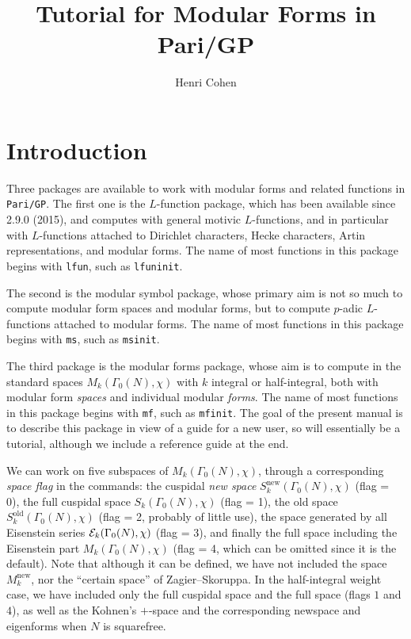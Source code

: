 \documentclass[11pt]{article}
\newcommand{\G}{\Gamma}
\newcommand{\new}{\text{new}}
\def\kbd#1{{\tt #1}}
\begin{document}
\pagestyle{plain}

\title{Tutorial for Modular Forms in Pari/GP}
\author{Henri Cohen}

\maketitle

\smallskip

\section{Introduction}

Three packages are available to work with modular forms and related functions
in \kbd{Pari/GP}. The first one is the $L$-function package, which has been
available since 2.9.0 (2015), and computes with general motivic
$L$-functions, and in particular with $L$-functions attached to Dirichlet
characters, Hecke characters, Artin representations, and modular forms. The
name of most functions in this package begins with \kbd{lfun}, such as
\kbd{lfuninit}.

The second is the modular symbol package, whose primary aim
is not so much to compute modular form spaces and modular forms, but to
compute $p$-adic $L$-functions attached to modular forms. The name of most
functions in this package begins with \kbd{ms}, such as \kbd{msinit}.

The third package is the modular forms package, whose aim is to compute in
the standard spaces $M_k(\G_0(N),\chi)$ with $k$ integral or half-integral,
both with modular form \emph{spaces} and individual modular \emph{forms}. The
name of most functions in this package begins with \kbd{mf}, such as
\kbd{mfinit}. The goal of the present manual is to describe this package in
view of a guide for a new user, so will essentially be a tutorial,
although we include a reference guide at the end.

\medskip

We can work on five subspaces of $M_k(\G_0(N),\chi)$, through a
corresponding \emph{space flag} in the commands: the cuspidal \emph{new
space} $S_k^{\new}(\G_0(N),\chi)$ (flag = 0), the full cuspidal space
$S_k(\G_0(N),\chi)$ (flag = 1), the old space $S_k^{\text{old}}(\G_0(N),\chi)$
(flag = 2, probably of little use), the space generated by all Eisenstein
series ${\cal E}_k(\G_0(N),\chi)$ (flag = 3), and finally the full space
including the Eisenstein part $M_k(\G_0(N),\chi)$ (flag = 4, which can be
omitted since it is the default). Note that although it can be defined, we have
not included the space $M_k^{\new}$, nor the ``certain space'' of
Zagier--Skoruppa. In the half-integral weight case, we have included
only the full cuspidal space and the full space (flags $1$ and $4$), as
well as the Kohnen's $+$-space and the corresponding newspace and eigenforms
when $N$ is squarefree.
\end{document}
